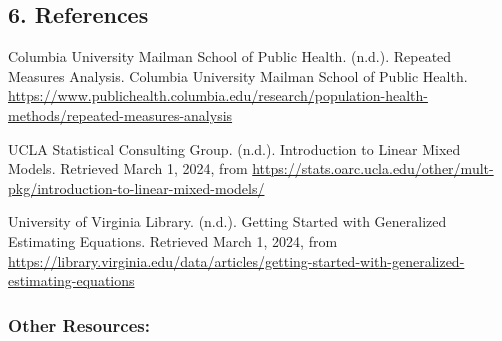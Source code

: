 \documentclass[
]{article}
\begin{document}
\pagebreak

\hypertarget{references}{%
\subsection{6. References}\label{references}}

Columbia University Mailman School of Public Health. (n.d.). Repeated
Measures Analysis. Columbia University Mailman School of Public Health.
\url{https://www.publichealth.columbia.edu/research/population-health-methods/repeated-measures-analysis}

UCLA Statistical Consulting Group. (n.d.). Introduction to Linear Mixed
Models. Retrieved March 1, 2024, from
\url{https://stats.oarc.ucla.edu/other/mult-pkg/introduction-to-linear-mixed-models/}

University of Virginia Library. (n.d.). Getting Started with Generalized
Estimating Equations. Retrieved March 1, 2024, from
\url{https://library.virginia.edu/data/articles/getting-started-with-generalized-estimating-equations}

\hypertarget{other-resources}{%
\subsubsection{Other Resources:}\label{other-resources}}
\end{document}
